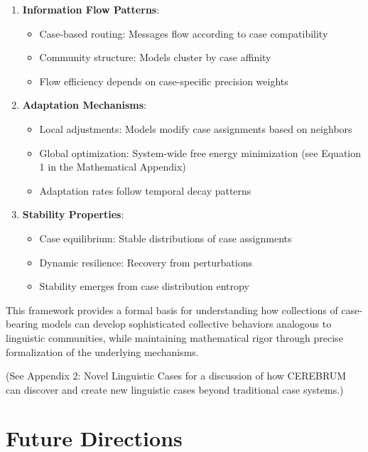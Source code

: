 \begin{enumerate}
\def\labelenumi{\arabic{enumi}.}
\tightlist
\item
  \textbf{Information Flow Patterns}:

  \begin{itemize}
  \tightlist
  \item
    Case-based routing: Messages flow according to case compatibility
  \item
    Community structure: Models cluster by case affinity
  \item
    Flow efficiency depends on case-specific precision weights
  \end{itemize}
\item
  \textbf{Adaptation Mechanisms}:

  \begin{itemize}
  \tightlist
  \item
    Local adjustments: Models modify case assignments based on neighbors
  \item
    Global optimization: System-wide free energy minimization (see
    Equation 1 in the Mathematical Appendix)
  \item
    Adaptation rates follow temporal decay patterns
  \end{itemize}
\item
  \textbf{Stability Properties}:

  \begin{itemize}
  \tightlist
  \item
    Case equilibrium: Stable distributions of case assignments
  \item
    Dynamic resilience: Recovery from perturbations
  \item
    Stability emerges from case distribution entropy
  \end{itemize}
\end{enumerate}

This framework provides a formal basis for understanding how collections
of case-bearing models can develop sophisticated collective behaviors
analogous to linguistic communities, while maintaining mathematical
rigor through precise formalization of the underlying mechanisms.

(See Appendix 2: Novel Linguistic Cases for a discussion of how CEREBRUM
can discover and create new linguistic cases beyond traditional case
systems.)

\hypertarget{future-directions}{%
\section{Future Directions}\label{future-directions}}


